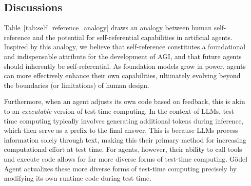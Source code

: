 \documentclass[11pt]{article}
\newcommand{\framework}{Gödel Agent\xspace}
\begin{document}
\subsection{Discussions}


Table~\ref{tab:self_reference_analogy} draws an analogy between human self-reference and the potential for self-referential capabilities in artificial agents. 
Inspired by this analogy, we believe that self-reference constitutes a foundational and indispensable attribute for the development of AGI, and that future agents should inherently be self-referential.
As foundation models grow in power, agents can more effectively enhance their own capabilities, ultimately evolving beyond the boundaries (or limitations) of human design.

Furthermore, when an agent adjusts its own code based on feedback, this is akin to an \textit{executable} version of test-time computing. In the context of LLMs, test-time computing typically involves generating additional tokens during inference, which then serve as a prefix to the final answer. This is because LLMs process information solely through text, making this their primary method for increasing computational effort at test time. For agents, however, their ability to call tools and execute code allows for far more diverse forms of test-time computing. \framework{} actualizes these more diverse forms of test-time computing precisely by modifying its own runtime code during test time.
\end{document}

